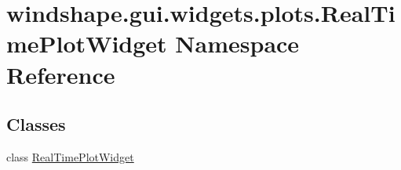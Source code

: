 \hypertarget{namespacewindshape_1_1gui_1_1widgets_1_1plots_1_1_real_time_plot_widget}{}\section{windshape.\+gui.\+widgets.\+plots.\+Real\+Time\+Plot\+Widget Namespace Reference}
\label{namespacewindshape_1_1gui_1_1widgets_1_1plots_1_1_real_time_plot_widget}
\subsection*{Classes}
\begin{DoxyCompactItemize}
\item 
class \mbox{\hyperlink{classwindshape_1_1gui_1_1widgets_1_1plots_1_1_real_time_plot_widget_1_1_real_time_plot_widget}{Real\+Time\+Plot\+Widget}}
\end{DoxyCompactItemize}
